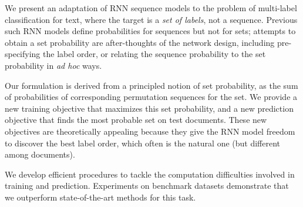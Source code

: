 We present an adaptation of RNN sequence models to the problem of multi-label classification for text, where the target is a \emph{set of labels}, not a sequence. Previous such RNN models define probabilities for sequences but not for sets; attempts to obtain a set probability are after-thoughts of the network design, including pre-specifying the label order, or relating the sequence probability to the set probability in \textit{ad hoc} ways.

Our formulation is derived from a principled notion of set probability, as the sum of probabilities of corresponding permutation  sequences for the set. We provide a new training objective that maximizes this set probability, and a new prediction objective that finds the most probable set on test documents. These new objectives are theoretically appealing because they give the RNN model freedom to discover the best label order, which often is the natural one (but different among documents). 

We develop efficient procedures to tackle the computation difficulties involved in training and prediction. Experiments on benchmark datasets demonstrate that we outperform state-of-the-art methods for this task.
